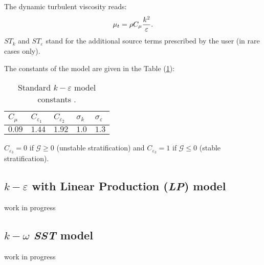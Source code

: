 The dynamic turbulent viscosity reads: 
\begin{equation}
\displaystyle \mu_t=\rho C_\mu\frac{k^2}{%
\varepsilon}.
\end{equation}
$ST_{k}$ and $ST_{\varepsilon}$ stand for the additional
source terms prescribed by the user (in rare cases only).

The constants of the model are given in the Table (\ref{tab:k_epsilon_constants}):
\begin{table}[!htp]
\centering
\begin{tabular}{p{}|p{}|p{}|p{}|p{}}
$C_\mu$ & $C_{\varepsilon_1}$ & $C_{\varepsilon_2}$ & $\sigma_k$ & $%
\sigma_\varepsilon$ \\ \hline
$0.09$ & $1.44$ & $1.92$ & $1.0$ & $1.3$ 
\end{tabular}%
\caption{Standard $k-\varepsilon$ model constants \cite{Launder:1972}.\label{tab:k_epsilon_constants}}
\end{table}

$C_{\varepsilon_3}=0$ if $\mathcal{G}\geqslant0$ (unstable stratification)
and $C_{\varepsilon_3}=1$ if $\mathcal{G}\leqslant0$ (stable stratification).

\subsection{$k-\varepsilon$ with Linear Production (\emph{LP}) model}
work in progress

\subsection{$k-\omega$ \emph{SST} model}
work in progress

